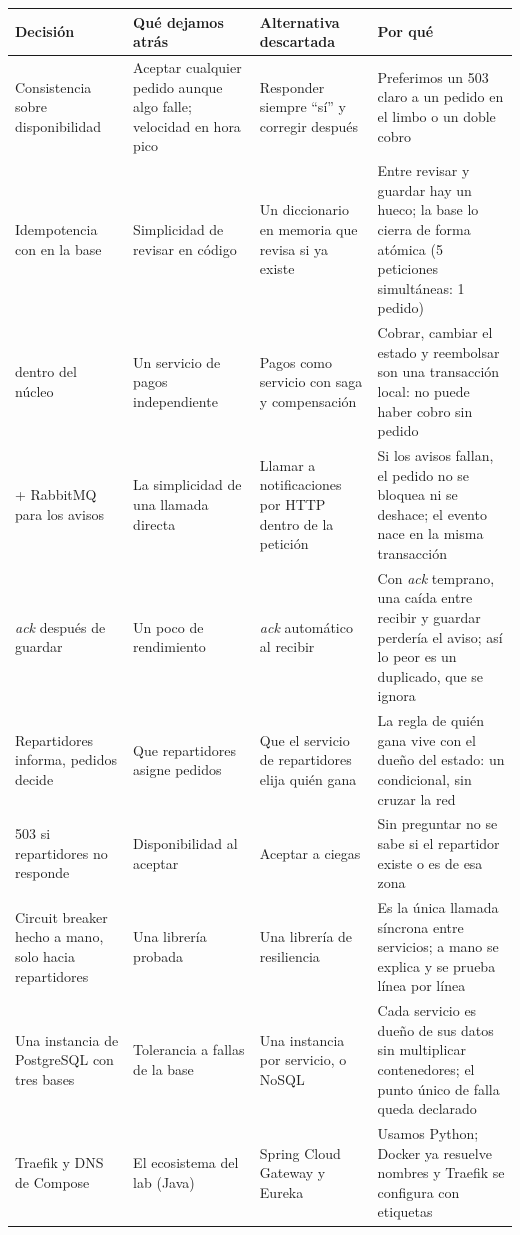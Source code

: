 \documentclass[11pt]{article}
\begin{document}
{\small\begin{longtable}{@{}P{3.0cm} P{3.4cm} P{3.3cm} P{5.2cm}@{}}
\toprule
\textsf{\textbf{Decisión}} & \textsf{\textbf{Qué dejamos atrás}} & \textsf{\textbf{Alternativa descartada}} & \textsf{\textbf{Por qué}} \\
\midrule
\endhead
Consistencia sobre disponibilidad & Aceptar cualquier pedido aunque algo falle; velocidad en hora pico & Responder siempre ``sí'' y corregir después & Preferimos un 503 claro a un pedido en el limbo o un doble cobro \\
Idempotencia con  en la base & Simplicidad de revisar en código & Un diccionario en memoria que revisa si ya existe & Entre revisar y guardar hay un hueco; la base lo cierra de forma atómica (5 peticiones simultáneas: 1 pedido) \\
 dentro del núcleo & Un servicio de pagos independiente & Pagos como servicio con saga y compensación & Cobrar, cambiar el estado y reembolsar son una transacción local: no puede haber cobro sin pedido \\
 + RabbitMQ para los avisos & La simplicidad de una llamada directa & Llamar a notificaciones por HTTP dentro de la petición & Si los avisos fallan, el pedido no se bloquea ni se deshace; el evento nace en la misma transacción \\
\emph{ack} después de guardar & Un poco de rendimiento & \emph{ack} automático al recibir & Con \emph{ack} temprano, una caída entre recibir y guardar perdería el aviso; así lo peor es un duplicado, que se ignora \\
Repartidores informa, pedidos decide & Que repartidores asigne pedidos & Que el servicio de repartidores elija quién gana & La regla de quién gana vive con el dueño del estado: un  condicional, sin cruzar la red \\
503 si repartidores no responde & Disponibilidad al aceptar & Aceptar a ciegas & Sin preguntar no se sabe si el repartidor existe o es de esa zona \\
Circuit breaker hecho a mano, solo hacia repartidores & Una librería probada & Una librería de resiliencia & Es la única llamada síncrona entre servicios; a mano se explica y se prueba línea por línea \\
Una instancia de PostgreSQL con tres bases & Tolerancia a fallas de la base & Una instancia por servicio, o NoSQL & Cada servicio es dueño de sus datos sin multiplicar contenedores; el punto único de falla queda declarado \\
Traefik y DNS de Compose & El ecosistema del lab (Java) & Spring Cloud Gateway y Eureka & Usamos Python; Docker ya resuelve nombres y Traefik se configura con etiquetas \\
\bottomrule
\end{longtable}}
\end{document}
